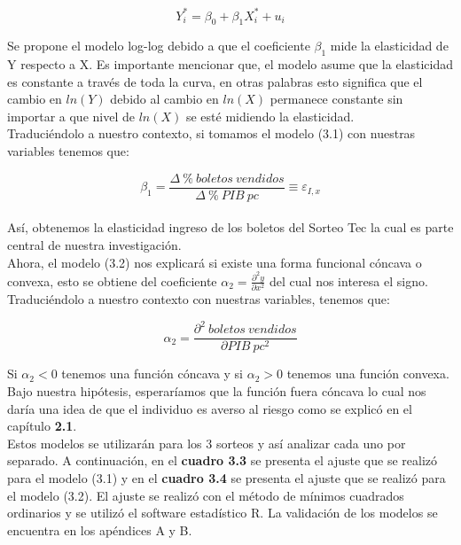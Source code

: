 \begin{equation}
    Y_i^* = \beta_0 + \beta_1X_i^* + u_i
\end{equation}

Se propone el modelo log-log debido a que el coeficiente $\beta_1$ mide la elasticidad de Y respecto a X. Es importante mencionar que, el modelo asume que la elasticidad es constante a través de toda la curva, en otras palabras esto significa que el cambio en $ln(Y)$ debido al cambio en $ln(X)$ permanece constante sin importar a que nivel de $ln(X)$ se esté midiendo la elasticidad. \\

Traduciéndolo a nuestro contexto, si tomamos el modelo (3.1) con nuestras variables tenemos que:

\begin{equation}
    \beta_1 = \frac{\Delta \: \% \:boletos \: vendidos}{\Delta \: \% \: PIB \: pc} \equiv \varepsilon_{I,x}
\end{equation} \\


Así, obtenemos la elasticidad ingreso de los boletos del Sorteo Tec la cual es parte central de nuestra investigación. \\

Ahora, el modelo (3.2) nos explicará si existe una forma funcional cóncava o convexa, esto se obtiene del coeficiente $\alpha_2 = \frac{\partial^2 y}{\partial x^2}$ del cual nos interesa el signo. Traduciéndolo a nuestro contexto con nuestras variables, tenemos que:

\begin{equation}
    \alpha_2 = \frac{\partial^2 \:boletos \: vendidos}{\partial PIB \: pc^2}
\end{equation}

Si $\alpha_2 < 0$ tenemos una función cóncava y si $\alpha_2 > 0$ tenemos una función convexa. Bajo nuestra hipótesis, esperaríamos que la función fuera cóncava lo cual nos daría una idea de que el individuo es averso al riesgo como se explicó en el capítulo \textbf{2.1}. \\

Estos modelos se utilizarán para los 3 sorteos y así analizar cada uno por separado. A continuación, en el \textbf{cuadro 3.3} se presenta el ajuste que se realizó para el modelo (3.1) y en el \textbf{cuadro 3.4} se presenta el ajuste que se realizó para el modelo (3.2). El ajuste se realizó con el método de mínimos cuadrados ordinarios y se utilizó el software estadístico R. La validación de los modelos se encuentra en los apéndices A y B. \\

